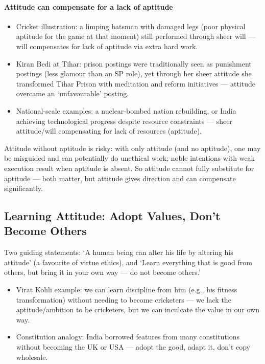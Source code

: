 \paragraph{Attitude can compensate for a lack of aptitude}
\begin{itemize}
\item Cricket illustration: a limping batsman with damaged legs (poor physical aptitude for the game at that moment) still performed through sheer will --- will compensates for lack of aptitude via extra hard work.
\item Kiran Bedi at Tihar: prison postings were traditionally seen as punishment postings (less glamour than an SP role), yet through her sheer attitude she transformed Tihar Prison with meditation and reform initiatives --- attitude overcame an `unfavourable' posting.
\item National-scale examples: a nuclear-bombed nation rebuilding, or India achieving technological progress despite resource constraints --- sheer attitude/will compensating for lack of resources (aptitude).
\end{itemize}

\begin{CriticalPoint}
Attitude without aptitude is risky: with only attitude (and no aptitude), one may be misguided and can potentially do unethical work; noble intentions with weak execution result when aptitude is absent. So attitude cannot fully substitute for aptitude --- both matter, but attitude gives direction and can compensate significantly.
\end{CriticalPoint}

\subsection{Learning Attitude: Adopt Values, Don't Become Others}

Two guiding statements: `A human being can alter his life by altering his attitude' (a favourite of virtue ethics), and `Learn everything that is good from others, but bring it in your own way --- do not become others.'

\begin{itemize}
\item Virat Kohli example: we can learn discipline from him (e.g., his fitness transformation) without needing to become cricketers --- we lack the aptitude/ambition to be cricketers, but we can inculcate the value in our own way.
\item Constitution analogy: India borrowed features from many constitutions without becoming the UK or USA --- adopt the good, adapt it, don't copy wholesale.
\end{itemize}

